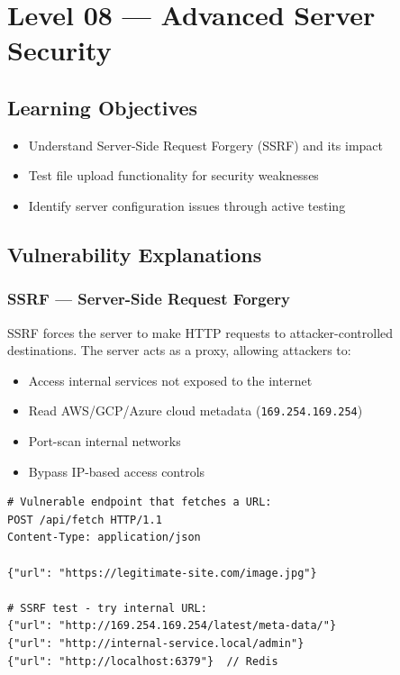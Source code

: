\chapter{Level 08 — Advanced Server Security}
\label{ch:level08}


\section{Learning Objectives}
\begin{itemize}
  \item Understand Server-Side Request Forgery (SSRF) and its impact
  \item Test file upload functionality for security weaknesses
  \item Identify server configuration issues through active testing
\end{itemize}

\section{Vulnerability Explanations}

\subsection{SSRF — Server-Side Request Forgery}
SSRF forces the server to make HTTP requests to attacker-controlled destinations. The server acts as a proxy, allowing attackers to:
\begin{itemize}
  \item Access internal services not exposed to the internet
  \item Read AWS/GCP/Azure cloud metadata (\texttt{169.254.169.254})
  \item Port-scan internal networks
  \item Bypass IP-based access controls
\end{itemize}

\begin{lstlisting}[style=http, caption={Classic SSRF test}]
# Vulnerable endpoint that fetches a URL:
POST /api/fetch HTTP/1.1
Content-Type: application/json

{"url": "https://legitimate-site.com/image.jpg"}

# SSRF test - try internal URL:
{"url": "http://169.254.169.254/latest/meta-data/"}
{"url": "http://internal-service.local/admin"}
{"url": "http://localhost:6379"}  // Redis
\end{lstlisting}

